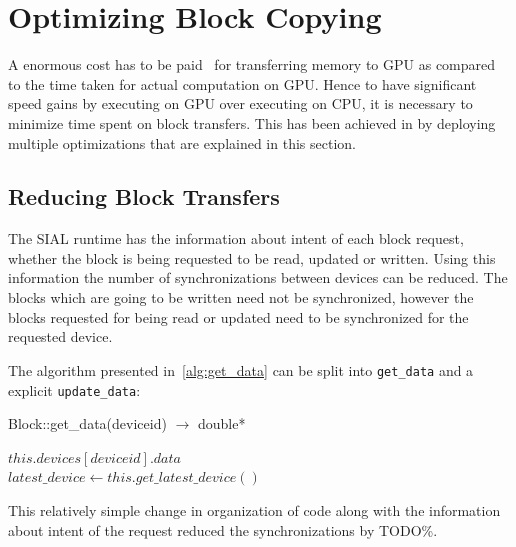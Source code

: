 \section{Optimizing Block Copying}
A enormous cost has to be paid~\cite{Bakkum2010}\cite{memorytransferoverhead}
for transferring memory to GPU as compared to the time taken for actual computation
on GPU. Hence to have significant speed gains by executing on GPU over executing
on CPU, it is necessary to minimize time spent on block transfers. This has been
achieved in by deploying multiple optimizations that are explained in this section.

\subsection{Reducing Block Transfers}
The SIAL runtime has the information about intent of each block request, whether
the block is being requested to be read, updated or written. Using this information the
number of synchronizations between devices can be reduced. The blocks which are
going to be written need not be synchronized, however the blocks requested for
being read or updated need to be synchronized for the requested device.

The algorithm presented in~\ref{alg:get_data} can be split into
\texttt{get\_data} and a explicit \texttt{update\_data}:

\begin{algorithm}  {Block::get\_data(deviceid) $\rightarrow$ double*}
  \singlespacing

  \begin{algorithmic}[1]
    \State \Return $this.devices[deviceid].data$
    \EndFunction
    \\
    \State $latest\_device \gets this.get\_latest\_device()$
    \EndIf
    \EndFunction
  \end{algorithmic}
\end{algorithm}

This relatively simple change in organization of code along with the information
about intent of the request reduced the synchronizations by TODO\%.

